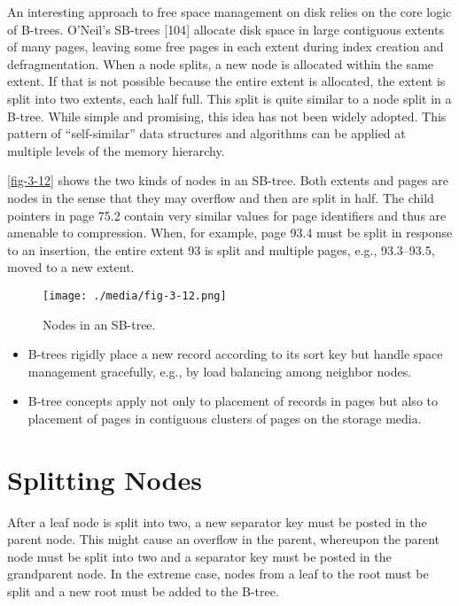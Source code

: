 An interesting approach to free space management on disk relies on the
core logic of B-trees. O'Neil's SB-trees {[}104{]} allocate disk space
in large contiguous extents of many pages, leaving some free pages in
each extent during index creation and defragmentation. When a node
splits, a new node is allocated within the same extent. If that is not
possible because the entire extent is allocated, the extent is split
into two extents, each half full. This split is quite similar to a node
split in a B-tree. While simple and promising, this idea has not been
widely adopted. This pattern of ``self-similar'' data structures and
algorithms can be applied at multiple levels of the memory hierarchy.

\autoref{fig-3-12} shows the two kinds of nodes in an SB-tree. Both extents and
pages are nodes in the sense that they may overflow and then are split
in half. The child pointers in page 75.2 contain very similar values for
page identifiers and thus are amenable to compression. When, for
example, page 93.4 must be split in response to an insertion, the entire
extent 93 is split and multiple pages, e.g., 93.3--93.5, moved to a new
extent.

\begin{figure}
  \centering
  \texttt{[image: ./media/fig-3-12.png]}

  \caption{Nodes in an SB-tree.\label{fig-3-12}}
\end{figure}

\begin{itemize}
\item
  B-trees rigidly place a new record according to its sort key but
  handle space management gracefully, e.g., by load balancing among
  neighbor nodes.
\item
  B-tree concepts apply not only to placement of records in pages but
  also to placement of pages in contiguous clusters of pages on the
  storage media.
\end{itemize}

\hypertarget{splitting-nodes}{%
\section{Splitting Nodes}\label{splitting-nodes}}

After a leaf node is split into two, a new separator key must be posted
in the parent node. This might cause an overflow in the parent,
whereupon the parent node must be split into two and a separator key
must be posted in the grandparent node. In the extreme case, nodes from
a leaf to the root must be split and a new root must be added to the
B-tree.

